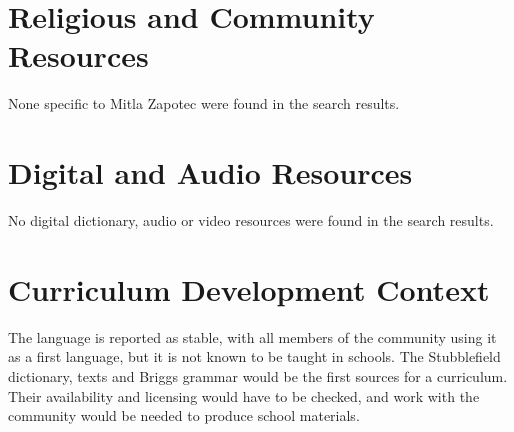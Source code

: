 \documentclass[12pt]{article}
\begin{document}
\section{Religious and Community Resources}
None specific to Mitla Zapotec were found in the search results.

\section{Digital and Audio Resources}
No digital dictionary, audio or video resources were found in the search results.

\section{Curriculum Development Context}
The language is reported as stable, with all members of the community using it as a first language, but it is not known to be taught in schools. The Stubblefield dictionary, texts and Briggs grammar would be the first sources for a curriculum. Their availability and licensing would have to be checked, and work with the community would be needed to produce school materials.
\end{document}
